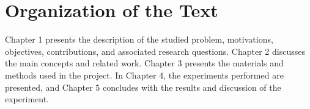 \section{Organization of the Text}

Chapter 1 presents the description of the studied problem, motivations, objectives, contributions, and associated research questions. Chapter 2 discusses the main concepts and related work. Chapter 3 presents the materials and methods used in the project. In Chapter 4, the experiments performed are presented, and Chapter 5 concludes with the results and discussion of the experiment.